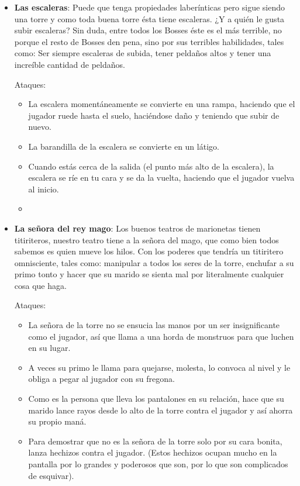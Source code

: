 \begin{itemize}
    \item \textbf{Las escaleras}: Puede que tenga propiedades laberínticas pero sigue siendo una torre y como toda buena torre ésta tiene escaleras. ¿Y a quién le gusta subir escaleras? Sin duda, entre todos los Bosses éste es el más terrible, no porque el resto de Bosses den pena, sino por sus terribles habilidades, tales como: Ser siempre escaleras de subida, tener peldaños altos y tener una increíble cantidad de peldaños.
    
    Ataques:
    \begin{itemize}
        \item La escalera momentáneamente se convierte en una rampa, haciendo que el jugador ruede hasta el suelo, haciéndose daño y teniendo que subir de nuevo.
        \item La barandilla de la escalera se convierte en un látigo.
        \item Cuando estás cerca de la salida (el punto más alto de la escalera), la escalera se ríe en tu cara y se da la vuelta, haciendo que el jugador vuelva al inicio.
        \item 
    \end{itemize}

    \item \textbf{La señora del rey mago}: Los buenos teatros de marionetas tienen titiriteros, nuestro teatro tiene a la señora del mago, que como bien todos sabemos es quien mueve los hilos. Con los poderes que tendría un titiritero omnisciente, tales como: manipular a todos los seres de la torre, enchufar a su primo tonto y hacer que su marido se sienta mal por literalmente cualquier cosa que haga.
    
    Ataques:
    \begin{itemize}
        \item La señora de la torre no se ensucia las manos por un ser insignificante como el jugador, así que llama a una horda de monstruos para que luchen en su lugar.
        \item A veces su primo le llama para quejarse, molesta, lo convoca al nivel y le obliga a pegar al jugador con su fregona.
        \item Como es la persona que lleva los pantalones en su relación, hace que su marido lance rayos desde lo alto de la torre contra el jugador y así ahorra su propio maná.
        \item Para demostrar que no es la señora de la torre solo por su cara bonita, lanza hechizos contra el jugador. (Estos hechizos ocupan mucho en la pantalla por lo grandes y poderosos que son, por lo que son complicados de esquivar).
    \end{itemize}


\end{itemize}

